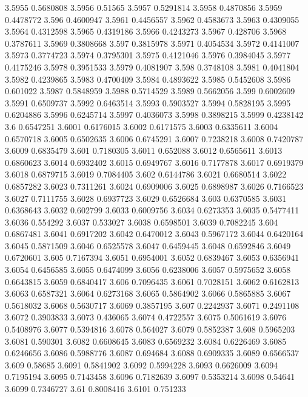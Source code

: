 3.5955  0.5680808
3.5956  0.51565
3.5957  0.5291814
3.5958  0.4870856
3.5959  0.4478772
3.596  0.4600947
3.5961  0.4456557
3.5962  0.4583673
3.5963  0.4309055
3.5964  0.4312598
3.5965  0.4319186
3.5966  0.4243273
3.5967  0.428706
3.5968  0.3787611
3.5969  0.3808668
3.597  0.3815978
3.5971  0.4054534
3.5972  0.4141007
3.5973  0.3774723
3.5974  0.3795301
3.5975  0.4121046
3.5976  0.3984045
3.5977  0.4175246
3.5978  0.3951533
3.5979  0.4081907
3.598  0.3748108
3.5981  0.4041804
3.5982  0.4239865
3.5983  0.4700409
3.5984  0.4893622
3.5985  0.5452608
3.5986  0.601022
3.5987  0.5848959
3.5988  0.5714529
3.5989  0.5662056
3.599  0.6002609
3.5991  0.6509737
3.5992  0.6463514
3.5993  0.5903527
3.5994  0.5828195
3.5995  0.6204886
3.5996  0.6245714
3.5997  0.4036073
3.5998  0.3898215
3.5999  0.4238142
3.6  0.6547251
3.6001  0.6176015
3.6002  0.6171575
3.6003  0.6335611
3.6004  0.6570718
3.6005  0.6502635
3.6006  0.6745291
3.6007  0.7238218
3.6008  0.7420787
3.6009  0.6835479
3.601  0.7180305
3.6011  0.652088
3.6012  0.6565611
3.6013  0.6860623
3.6014  0.6932402
3.6015  0.6949767
3.6016  0.7177878
3.6017  0.6919379
3.6018  0.6879715
3.6019  0.7084405
3.602  0.6144786
3.6021  0.6680514
3.6022  0.6857282
3.6023  0.7311261
3.6024  0.6909006
3.6025  0.6898987
3.6026  0.7166523
3.6027  0.7111755
3.6028  0.6937723
3.6029  0.6526684
3.603  0.6370585
3.6031  0.6368643
3.6032  0.602799
3.6033  0.6009756
3.6034  0.6273353
3.6035  0.5477411
3.6036  0.554292
3.6037  0.533027
3.6038  0.6598501
3.6039  0.7082245
3.604  0.6867481
3.6041  0.6917202
3.6042  0.6470012
3.6043  0.5967172
3.6044  0.6420164
3.6045  0.5871509
3.6046  0.6525578
3.6047  0.6459445
3.6048  0.6592846
3.6049  0.6720601
3.605  0.7167394
3.6051  0.6954001
3.6052  0.6839467
3.6053  0.6356941
3.6054  0.6456585
3.6055  0.6474099
3.6056  0.6238006
3.6057  0.5975652
3.6058  0.6643815
3.6059  0.6840417
3.606  0.7096435
3.6061  0.7028151
3.6062  0.6162813
3.6063  0.6587321
3.6064  0.6273168
3.6065  0.5864902
3.6066  0.5865885
3.6067  0.5618032
3.6068  0.5630717
3.6069  0.3857195
3.607  0.2242937
3.6071  0.2491108
3.6072  0.3903833
3.6073  0.436065
3.6074  0.4722557
3.6075  0.5061619
3.6076  0.5408976
3.6077  0.5394816
3.6078  0.564027
3.6079  0.5852387
3.608  0.5965203
3.6081  0.590301
3.6082  0.6608645
3.6083  0.6569232
3.6084  0.6226469
3.6085  0.6246656
3.6086  0.5988776
3.6087  0.694684
3.6088  0.6909335
3.6089  0.6566537
3.609  0.58685
3.6091  0.5841902
3.6092  0.5994228
3.6093  0.6626009
3.6094  0.7195194
3.6095  0.7143458
3.6096  0.7182639
3.6097  0.5353214
3.6098  0.54641
3.6099  0.7346727
3.61  0.8008416
3.6101  0.751233
